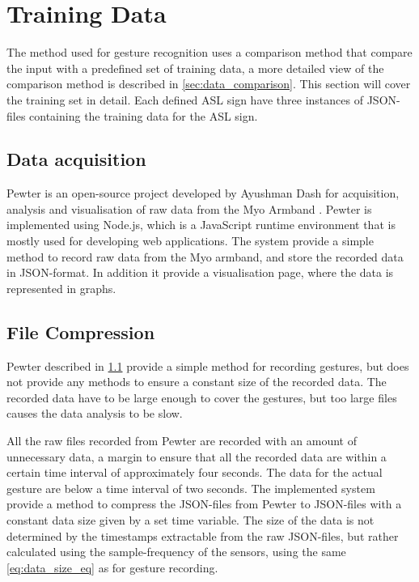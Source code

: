 \section{Training Data}
\label{sec:traning_data}
The method used for gesture recognition uses a comparison method that compare the input with a predefined set of training data, a more detailed view of the comparison method is described in \cref{sec:data_comparison}. This section will cover the training set in detail. Each defined ASL sign have three instances of JSON-files containing the training data for the ASL sign.

\subsection{Data acquisition}
\label{subsec:data_acquisition}
Pewter is an open-source project developed by Ayushman Dash for acquisition, analysis and visualisation of raw data from the Myo Armband \cite{github:pewter}. Pewter is implemented using Node.js, which is a JavaScript runtime environment that is mostly used for developing web applications. The system provide a simple method to record raw data from the Myo armband, and store the recorded data in JSON-format. In addition it provide a visualisation page, where the data is represented in graphs.

\subsection{File Compression}
\label{subsec:file_compress}
Pewter described in \cref{subsec:data_acquisition} provide a simple method for recording gestures, but does not provide any methods to ensure a constant size of the recorded data. The recorded data have to be large enough to cover the gestures, but too large files causes the data analysis to be slow. 

All the raw files recorded from Pewter are recorded with an amount of unnecessary data, a margin to ensure that all the recorded data are within a certain time interval of approximately four seconds. The data for the actual gesture are below a time interval of two seconds. The implemented system provide a method to compress the JSON-files from Pewter to JSON-files with a constant data size given by a set time variable. The size of the data is not determined by the timestamps extractable from the raw JSON-files, but rather calculated using the sample-frequency of the sensors, using the same \cref{eq:data_size_eq} as for gesture recording.